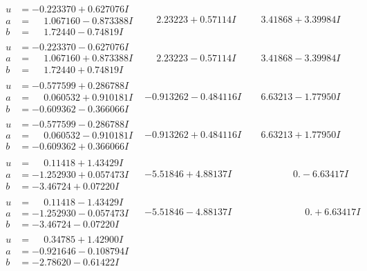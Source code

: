 \documentclass[1p]{elsarticle_modified}
\theoremstyle{definition}
\begin{document}
$$\begin{array}{c|c|c}
\begin{aligned}
u &= -0.223370 + 0.627076 I \\
a &= \phantom{-}1.067160 - 0.873388 I \\
b &= \phantom{-}1.72440 - 0.74819 I\end{aligned}
 & \phantom{-}2.23223 + 0.57114 I & \phantom{-}3.41868 + 3.39984 I \\ \hline\begin{aligned}
u &= -0.223370 - 0.627076 I \\
a &= \phantom{-}1.067160 + 0.873388 I \\
b &= \phantom{-}1.72440 + 0.74819 I\end{aligned}
 & \phantom{-}2.23223 - 0.57114 I & \phantom{-}3.41868 - 3.39984 I \\ \hline\begin{aligned}
u &= -0.577599 + 0.286788 I \\
a &= \phantom{-}0.060532 + 0.910181 I \\
b &= -0.609362 - 0.366066 I\end{aligned}
 & -0.913262 - 0.484116 I & \phantom{-}6.63213 - 1.77950 I \\ \hline\begin{aligned}
u &= -0.577599 - 0.286788 I \\
a &= \phantom{-}0.060532 - 0.910181 I \\
b &= -0.609362 + 0.366066 I\end{aligned}
 & -0.913262 + 0.484116 I & \phantom{-}6.63213 + 1.77950 I \\ \hline\begin{aligned}
u &= \phantom{-}0.11418 + 1.43429 I \\
a &= -1.252930 + 0.057473 I \\
b &= -3.46724 + 0.07220 I\end{aligned}
 & -5.51846 + 4.88137 I & \phantom{-0.000000 } 0. - 6.63417 I \\ \hline\begin{aligned}
u &= \phantom{-}0.11418 - 1.43429 I \\
a &= -1.252930 - 0.057473 I \\
b &= -3.46724 - 0.07220 I\end{aligned}
 & -5.51846 - 4.88137 I & \phantom{-0.000000 -}0. + 6.63417 I \\ \hline\begin{aligned}
u &= \phantom{-}0.34785 + 1.42900 I \\
a &= -0.921646 - 0.108794 I \\
b &= -2.78620 - 0.61422 I\end{aligned}

\end{array}$$
\end{document}
